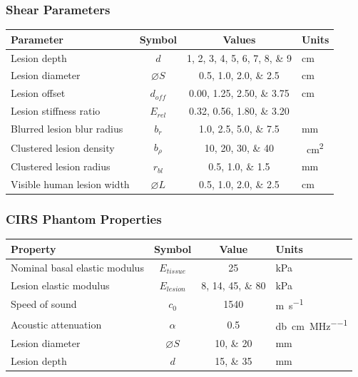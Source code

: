 \documentclass{beamer}
\begin{document}
		\begin{frame}[label=shearParameters]
			\frametitle{Shear Parameters}
			\centering
			\scriptsize

			\begin{tabular}{lccs[table-unit-alignment = left]}
				\toprule
				Parameter & Symbol & Values & Units \\
				\midrule
				Lesion depth & $d$ & \numlist{1;2;3;4;5;6;7;8;9} & \si{\cm} \\
				Lesion diameter & $\diameter S$ & \numlist{0.5;1.0;2.0;2.5} & \si{\cm} \\
				Lesion offset & $d_{off}$ & \numlist{0.00;1.25;2.50;3.75} & \si{\cm} \\
				Lesion stiffness ratio & $E_{rel}$ & \numlist{0.32;0.56;1.80;3.20} & \\
				Blurred lesion blur radius & $b_r$ & \numlist{1.0;2.5;5.0;7.5} & \si{\mm} \\
				Clustered lesion density & $b_\rho$ & \numlist{10;20;30;40} & \si{\per\cm\squared} \\
				Clustered lesion radius & $r_{bl}$ & \numlist{0.5;1.0;1.5} & \si{\mm} \\
				Visible human lesion width & $\diameter L$ & \numlist{0.5;1.0;2.0;2.5} & \si{\cm} \\
				\bottomrule
			\end{tabular}
		\end{frame}

		\begin{frame}[label=cirsProperties]
			\frametitle{CIRS Phantom Properties}
			\centering
			\scriptsize
			\begin{tabular}{lccs[table-unit-alignment = left]}
				\toprule
				Property & Symbol & Value & Units \\
				\midrule
				Nominal basal elastic modulus & $E_{tissue}$ & 25 & \si{\kPa} \\
				Lesion elastic modulus & $E_{lesion}$ & \numlist{8;14;45;80} & \si{\kPa} \\
				Speed of sound & $c_0$ & 1540 & \si{\metre\per\second} \\
				Acoustic attenuation & $\alpha$ & 0.5 & \si{\decibel\per\cm\per\MHz} \\
				Lesion diameter & $\diameter S$ & \numlist{10;20} & \si{\mm} \\
				Lesion depth & $d$ & \numlist{15;35} & \si{\mm} \\
				\bottomrule
			\end{tabular}
		\end{frame}
\end{document}
